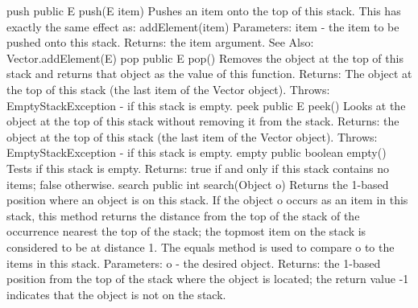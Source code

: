 \documentclass{book}
\begin{document}
push
public E push(E item)
Pushes an item onto the top of this stack. This has exactly the same effect as:
addElement(item)
Parameters:
item - the item to be pushed onto this stack.
Returns:
the item argument.
See Also:
Vector.addElement(E)
pop
public E pop()
Removes the object at the top of this stack and returns that object as the value of this function.
Returns:
The object at the top of this stack (the last item of the Vector object).
Throws:
EmptyStackException - if this stack is empty.
peek
public E peek()
Looks at the object at the top of this stack without removing it from the stack.
Returns:
the object at the top of this stack (the last item of the Vector object).
Throws:
EmptyStackException - if this stack is empty.
empty
public boolean empty()
Tests if this stack is empty.
Returns:
true if and only if this stack contains no items; false otherwise.
search
public int search(Object o)
Returns the 1-based position where an object is on this stack. If the object o occurs as an item in this stack, this method returns the distance from the top of the stack of the occurrence nearest the top of the stack; the topmost item on the stack is considered to be at distance 1. The equals method is used to compare o to the items in this stack.
Parameters:
o - the desired object.
Returns:
the 1-based position from the top of the stack where the object is located; the return value -1 indicates that the object is not on the stack.
\end{document}
